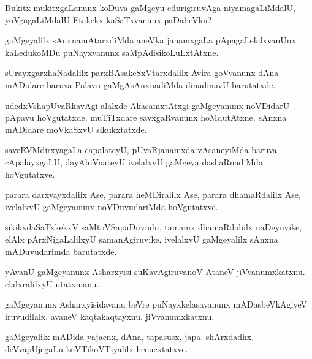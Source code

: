 \documentclass{article}
\begin{document}
\begin{mng}%
Bukitx mukitxgaLanunx koDuva gaMgeyu edurigiruvAga niyamagaLiMdalU, yoVgagaLiMdalU Etakekx kaSaTxvanunx paDabeVku?
\end{mng}

\begin{mng}%
gaMgeyalilx sAnxnamAtarxdiMda aneVka janamxgaLa pApagaLelalxvanUnx kaLedukoMDu puNayxvanunx saMpAdisikoLuLxtAtxne.
\end{mng}

\begin{mng}%
sUrayxgarxhaNadalilx parxBAsakeSxVtarxdalilx Avira goVvanunx dAna mADidare baruva Palavu gaMgAsAnxnadiMda dinadinavU barutatxde.
\end{mng}

\begin{mng}%
udedxVshapUvaRkavAgi alalxde AkasamxtAtxgi gaMgeyanunx noVDidarU pApavu hoVgutatxde. muTiTxdare savxgaRvanunx hoMdutAtxne. sAnxna mADidare moVkaSxvU sikukxtatxde.
\end{mng}

\begin{mng}%
saveRVMdirxyagaLa capalateyU, pUvaRjanamxda vAsaneyiMda baruva cApalayxgaLU, dayAhiVnateyU ivelalxvU gaMgeya dashaRnadiMda hoVgutatxve.
\end{mng}

\begin{mng}%
parara darxvayxdalilx Ase, parara heMDiralilx Ase, parara dhamaRdalilx Ase, ivelalxvU gaMgeyanunx noVDuvudariMda hoVgutatxve.
\end{mng}

\begin{mng}%
sikikxdaSaTxkekxV saMtoVSapaDuvudu, tamamx dhamaRdaliilx naDeyuvike, elAlx pArxNigaLalilxyU samanAgiruvike, ivelalxvU gaMgeyalilx sAnxna mADuvudarimda barutatxde.
\end{mng}

\begin{mng}%
yAvanU gaMgeyanunx Asharxyisi suKavAgiruvanoV AtaneV jiVvanumxkatxnu. elalxralilxyU utatxmanu.
\end{mng}

\begin{mng}%
gaMgeyanunx Asharxyisidavanu beVre puNayxkelasavanunx mADasbeVkAgiyeV iruvudilalx. avaneV kaqtakaqtayxnu. jiVvanumxkatxnu.
\end{mng}

\begin{mng}%
gaMgeyalilx mADida yajacnx, dAna, tapasusx, japa, shArxdadhx, deVvapUjegaLu koVTikoVTiyalilx hecucxtatxve.
\end{mng}
\end{document}
